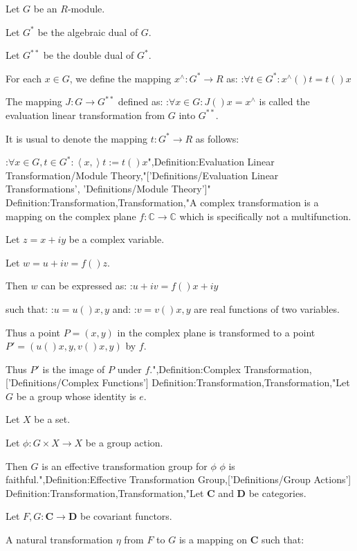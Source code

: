 Let $G$ be an $R$-module.

Let $G^*$ be the algebraic dual of $G$.

Let $G^{**}$ be the double dual of $G^*$.


For each $x \in G$, we define the mapping $x^\wedge: G^* \to R$ as:
:$\forall t \in G^*: x^\wedge \left(   \right)t = t \left(   \right)x$


The mapping $J: G \to G^{**}$ defined as:
:$\forall x \in G: J \left(   \right)x = x^\wedge$
is called the evaluation linear transformation from $G$ into $G^{**}$.


It is usual to denote the mapping $t: G^* \to R$ as follows:

:$\forall x \in G, t \in G^*: \left\langle x,   \right\rangle t := t \left(   \right)x$",Definition:Evaluation Linear Transformation/Module Theory,"['Definitions/Evaluation Linear Transformations', 'Definitions/Module Theory']"
Definition:Transformation,Transformation,"A complex transformation is a mapping on the complex plane $f: \mathbb C \to \mathbb C$ which is specifically not a multifunction.


Let $z = x + i y$ be a complex variable.

Let $w = u + i v = f \left(   \right)z$.


Then $w$ can be expressed as:
:$u + i v = f \left(   \right){x + i y}$

such that:
:$u = u \left(   \right){x, y}$
and:
:$v = v \left(   \right){x, y}$
are real functions of two variables.


Thus a point $P = \left( x, y \right)$ in the complex plane is transformed to a point $P' = \left( u \left(   \right){x, y}, v \left(   \right){x, y}  \right)$ by $f$.

Thus $P'$ is the image of $P$ under $f$.",Definition:Complex Transformation,['Definitions/Complex Functions']
Definition:Transformation,Transformation,"Let $G$ be a group whose identity is $e$.

Let $X$ be a set.

Let $\phi: G \times X \to X$ be a group action.


Then $G$ is an effective transformation group for $\phi$  $\phi$ is faithful.",Definition:Effective Transformation Group,['Definitions/Group Actions']
Definition:Transformation,Transformation,"Let $\mathbf C$ and $\mathbf D$ be categories.

Let $F, G : \mathbf C \to \mathbf D$ be covariant functors.


A natural transformation $\eta$ from $F$ to $G$ is a mapping on $\mathbf C$ such that:



